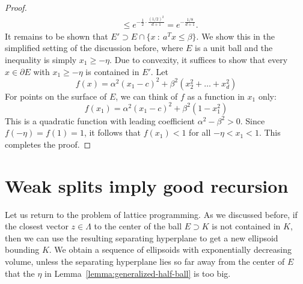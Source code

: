 \begin{proof}
\begin{align*}
    &\leq e^{-\frac{1}{2}\cdot \frac{(1/2)^2}{d+1}} = e^{-\frac{1/8}{d+1}}.
  \end{align*}
  It remains to be shown that $E' \supset E \cap \{ x ~:~ a^Tx \leq \beta \}$.
  We show this in the simplified setting of the discussion before,
  where $E$ is a unit ball and the inequality is simply $x_1 \geq -\eta$.
  Due to convexity, it suffices to show that every $x \in \partial E$ with $x_1 \geq -\eta$ is contained in $E'$.
  Let
  \[
    f(x) = \alpha^2 (x_1-c)^2 + \beta^2(x_2^2 + \dots + x_d^2)
  \]
  For points on the surface of $E$, we can think of $f$ as a function in $x_1$ only:
  \[
    f(x_1) = \alpha^2 (x_1-c)^2 + \beta^2(1-x_1^2)
  \]
  This is a quadratic function with leading coefficient $\alpha^2 - \beta^2 > 0$.
  Since $f(-\eta) = f(1) = 1$, it follows that $f(x_1) < 1$ for all $-\eta < x_1 < 1$.
  This completes the proof.
\end{proof}








\section{Weak splits imply good recursion}

Let us return to the problem of lattice programming.
As we discussed before, if the closest vector $z \in \Lambda$
to the center of the ball $E \supset K$ is not contained in $K$,
then we can use the resulting separating hyperplane to get a new ellipsoid bounding $K$.
We obtain a sequence of ellipsoids with exponentially decreasing volume,
unless the separating hyperplane lies so far away from the center of $E$
that the $\eta$ in Lemma~\ref{lemma:generalized-half-ball} is too big.

